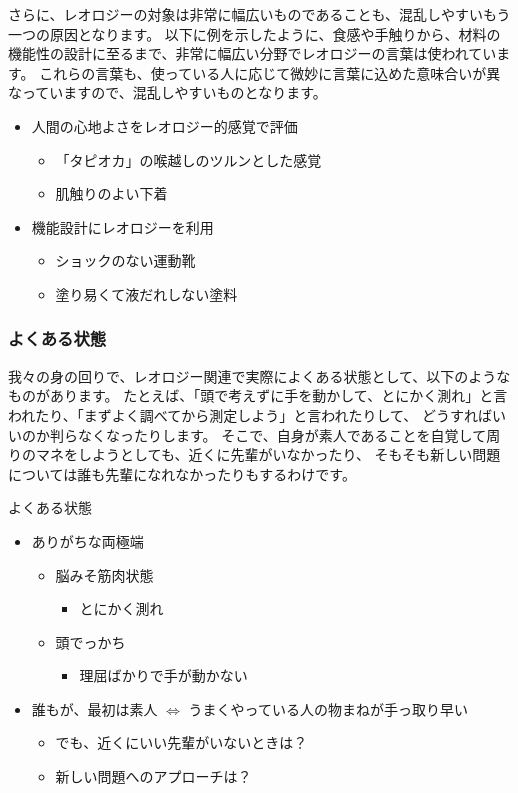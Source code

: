 \documentclass[uplatex,dvipdfmx,a4paper,11pt]{jsarticle}
\begin{document}
さらに、レオロジーの対象は非常に幅広いものであることも、混乱しやすいもう一つの原因となります。
以下に例を示したように、食感や手触りから、材料の機能性の設計に至るまで、非常に幅広い分野でレオロジーの言葉は使われています。
これらの言葉も、使っている人に応じて微妙に言葉に込めた意味合いが異なっていますので、混乱しやすいものとなります。
	\begin{itemize}
		\item 人間の心地よさをレオロジー的感覚で評価
		\begin{itemize}
			\item 「タピオカ」の喉越しのツルンとした感覚
			\item 肌触りのよい下着
		\end{itemize}
		\item 機能設計にレオロジーを利用
		\begin{itemize}
			\item ショックのない運動靴
			\item 塗り易くて液だれしない塗料
		\end{itemize}
	\end{itemize}

\subsubsection{よくある状態}

我々の身の回りで、レオロジー関連で実際によくある状態として、以下のようなものがあります。
たとえば、「頭で考えずに手を動かして、とにかく測れ」と言われたり、「まずよく調べてから測定しよう」と言われたりして、
どうすればいいのか判らなくなったりします。
そこで、自身が素人であることを自覚して周りのマネをしようとしても、近くに先輩がいなかったり、
そもそも新しい問題については誰も先輩になれなかったりもするわけです。
\large
	\begin{itembox}[l]{よくある状態}
		\begin{itemize}
			\item ありがちな両極端
			\begin{itemize}
				\item 脳みそ筋肉状態
				\begin{itemize}
					\item とにかく測れ
				\end{itemize}
				\item 頭でっかち
				\begin{itemize}
					\item 理屈ばかりで手が動かない
				\end{itemize}
			\end{itemize}
			\item 誰もが、最初は素人 $\Leftrightarrow$ うまくやっている人の物まねが手っ取り早い
			\begin{itemize}
				\item でも、近くにいい先輩がいないときは？
				\item 新しい問題へのアプローチは？
			\end{itemize}
		\end{itemize}
	\end{itembox}
\normalsize
\end{document}
